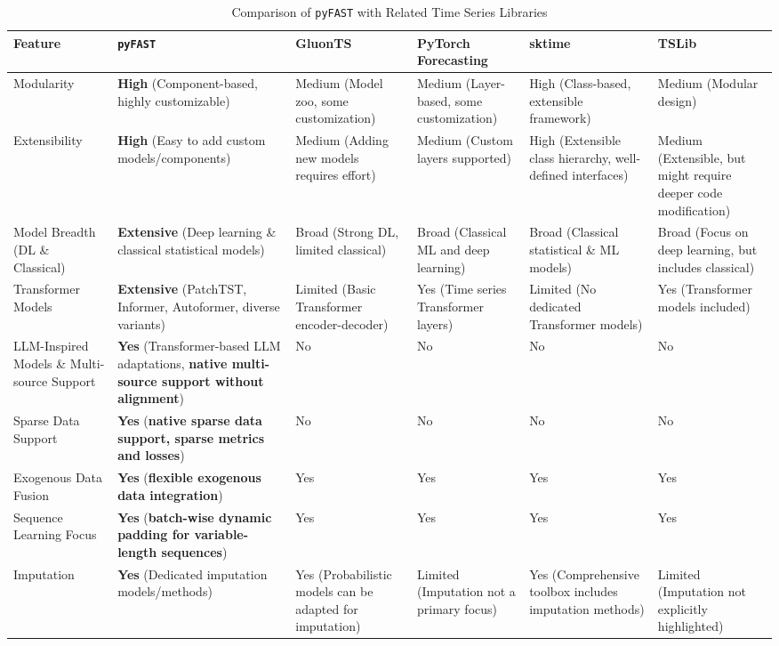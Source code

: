 \documentclass[twoside,11pt]{article}
\begin{document}
\begin{table*}[t!]
    \centering
    \caption{Comparison of \texttt{pyFAST} with Related Time Series Libraries}
    \label{tab:library_comparison}
    {\scriptsize
    \begin{tabularx}{\textwidth}{@{}p{1.6cm}p{3cm}p{2.1cm}p{2.1cm}p{2.1cm}p{2.1cm}@{}}
    \toprule
    \textbf{Feature} & \textbf{\texttt{pyFAST}} & \textbf{GluonTS} & \textbf{PyTorch Forecasting} & \textbf{sktime} & \textbf{TSLib} \\
    \midrule
    Modularity & \textbf{High} (Component-based, highly customizable) & Medium (Model zoo, some customization) & Medium (Layer-based, some customization) & High (Class-based, extensible framework) & Medium (Modular design) \\
    Extensibility & \textbf{High} (Easy to add custom models/components) & Medium (Adding new models requires effort) & Medium (Custom layers supported) & High (Extensible class hierarchy, well-defined interfaces) & Medium (Extensible, but might require deeper code modification) \\
    Model Breadth (DL \& Classical) & \textbf{Extensive} (Deep learning \& classical statistical models) & Broad (Strong DL, limited classical) & Broad (Classical ML and deep learning) & Broad (Classical statistical \& ML models) & Broad (Focus on deep learning, but includes classical) \\
    Transformer Models & \textbf{Extensive} (PatchTST, Informer, Autoformer, diverse variants) & Limited (Basic Transformer encoder-decoder) & Yes (Time series Transformer layers) & Limited (No dedicated Transformer models) & Yes (Transformer models included) \\
    LLM-Inspired Models \& Multi-source Support & \textbf{Yes} (Transformer-based LLM adaptations, \textbf{native multi-source support without alignment}) & No & No & No & No \\
    Sparse Data Support & \textbf{Yes} (\textbf{native sparse data support, sparse metrics and losses}) & No & No & No & No \\
    Exogenous Data Fusion & \textbf{Yes} (\textbf{flexible exogenous data integration}) & Yes & Yes & Yes & Yes \\
    Sequence Learning Focus & \textbf{Yes} (\textbf{batch-wise dynamic padding for variable-length sequences}) & Yes & Yes & Yes & Yes \\
    Imputation & \textbf{Yes} (Dedicated imputation models/methods) & Yes (Probabilistic models can be adapted for imputation) & Limited (Imputation not a primary focus) & Yes (Comprehensive toolbox includes imputation methods) & Limited (Imputation not explicitly highlighted) \\

\end{tabularx}}
\end{table*}
\end{document}
